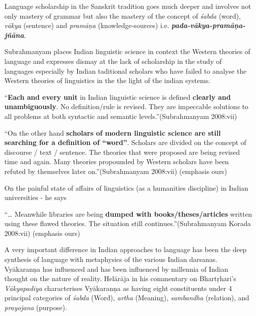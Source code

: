 Language scholarship in the Sanskrit tradition goes much deeper and involves not only mastery of grammar but also the mastery of the concept of \textit{śabda} (word), \textit{vākya} (sentence) and \textit{pramāṇa} (knowledge-sources) i.e. \textbf{\textit{pada-vākya-pramāṇa-jñāna}}.

Subrahmanyam places Indian linguistic science in context the Western theories of language and expresses dismay at the lack of scholarship in the study of languages especially by Indian taditional scholars who have failed to analyse the Western theories of linguistics in the the light of the indian systems.

\begin{myquote}
“\textbf{Each and every unit} in Indian linguistic science is defined \textbf{clearly and unambiguously}. No definition/rule is revised. They are impeccable solutions to all problems at both syntactic and semantic levels.”\hfill (Subrahmanyam 2008:vii)
\end{myquote}

\begin{myquote}
“On the other hand \textbf{scholars of modern linguistic science are still searching for a definition of “word”}. Scholars are divided on the concept of discourse / text / sentence. The theories that were proposed are being revised time and again. Many theories propounded by Western scholars have been refuted by themselves later on.”\hfill (Subrahmanyam 2008:vii) (emphasis ours)
\end{myquote}

On the painful state of affairs of linguistics (as a humanities discipline) in Indian universities - he says

\begin{myquote}
“… Meanwhile libraries are being \textbf{dumped with books/theses/articles} written using these flawed theories. The situation still continues.”\hfill (Subrahmanyam Korada 2008:vii) (emphasis ours)
\end{myquote}

A very important difference in Indian approaches to language has been the deep synthesis of language with metaphysics of the various Indian darsanas. Vyākaranṇa has influenced and has been influenced by millennia of Indian thought on the nature of reality. Helārāja in his commentary on Bhartṛhari’s \textit{Vākyapadīya} characterises Vyākaranṇa as having eight constituents under 4 principal categories of \textit{śabda} (Word), \textit{artha} (Meaning), \textit{sambandha} (relation), and \textit{prayojana} (purpose).

